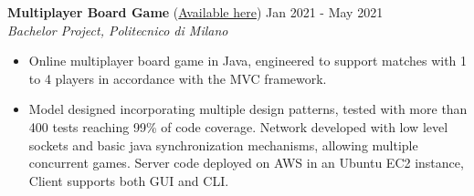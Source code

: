 
\noindent
\textbf{Multiplayer Board Game} (\href{https://github.com/GiuseppeCalderonio/ingswAM2021-Calderonio-Carollo-Chiodini}{Available here}) \hfill Jan 2021 - May 2021 \\
\textit{Bachelor Project, Politecnico di Milano}
\begin{itemize}[noitemsep,topsep=0pt]
    \item Online multiplayer board game in Java, engineered to support matches with 1 to 4 players in accordance with the MVC framework.
    \item Model designed incorporating multiple design patterns, tested with more than 400 tests reaching 99\% of code coverage. Network developed with low level sockets and basic java synchronization mechanisms, allowing multiple concurrent games. Server code deployed on AWS in an Ubuntu EC2 instance, Client supports both GUI and CLI.
\end{itemize}

